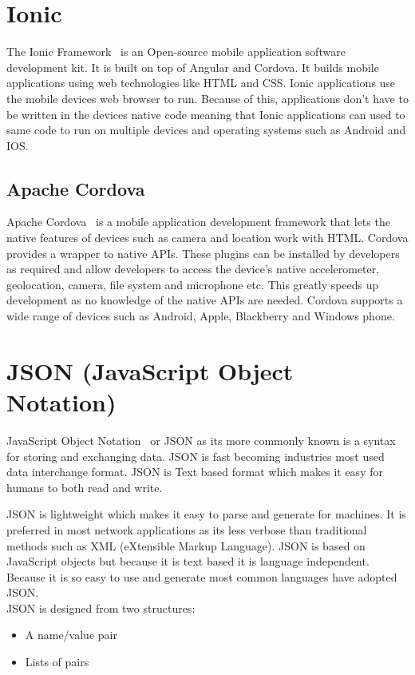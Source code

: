 \section{Ionic}
The Ionic Framework~\cite{Ionic} is an Open-source mobile application software development kit. It is built on top of Angular and Cordova. It builds mobile applications using web technologies like HTML and CSS. Ionic applications use the mobile devices web browser to run. Because of this, applications don’t have to be written in the devices native code meaning that Ionic applications can used to same code to run on multiple devices and operating systems such as Android and IOS.

\subsection{Apache Cordova}
Apache Cordova~\cite{Cordova} is a mobile application development framework that lets the native features of devices such as camera and location work with HTML. Cordova provides a wrapper to native APIs. These plugins can be installed by developers as required and allow developers to access the device's native accelerometer, geolocation, camera, file system and microphone etc. This greatly speeds up development as no knowledge of the native APIs are needed. Cordova supports a wide range of devices such as Android, Apple, Blackberry and Windows phone.

\section{JSON (JavaScript Object Notation)}
JavaScript Object Notation~\cite{Json} or JSON as its more commonly known is a syntax for storing and exchanging data. JSON is fast becoming industries most used data interchange format. JSON is Text based format which makes it easy for humans to both read and write.

JSON is lightweight which makes it easy to parse and generate for machines. It is preferred in most network applications as its less verbose than traditional methods such as XML (eXtensible Markup Language). JSON is based on JavaScript objects but because it is text based it is language independent. Because it is so easy to use and generate most common languages have adopted JSON. \\

JSON is designed from two structures:
\begin{itemize}
\item A name/value pair
\item Lists of pairs
\end{itemize}	


